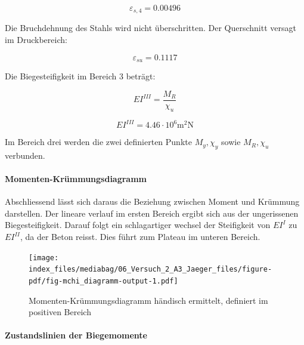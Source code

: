 \documentclass[
  12pt,
  letterpaper,
  egregdoesnotlikesansseriftitles]{scrreprt}
\let\oldparagraph\paragraph
\renewcommand{\paragraph}[1]{\oldparagraph{#1}\mbox{}}
\begin{document}
\begin{equation}\varepsilon_{s,4} = 0.00496\end{equation}

Die Bruchdehnung des Stahls wird nicht überschritten. Der Querschnitt
versagt im Druckbereich:

\begin{equation}\varepsilon_{su} = 0.1117\end{equation}

Die Biegesteifigkeit im Bereich 3 beträgt:

\begin{equation}EI^{III} = \frac{M_{R}}{\chi_{u}}\end{equation}

\begin{equation}EI^{III} = 4.46 \cdot 10^{6} \text{m}^{2} \text{N}\end{equation}

Im Bereich drei werden die zwei definierten Punkte \(M_y, \chi_y\) sowie
\(M_R, \chi_u\) verbunden.

\hypertarget{momenten-kruxfcmmungsdiagramm-1}{%
\paragraph{Momenten-Krümmungsdiagramm}\label{momenten-kruxfcmmungsdiagramm-1}}

Abschliessend lässt sich daraus die Beziehung zwischen Moment und
Krümmung darstellen. Der lineare verlauf im ersten Bereich ergibt sich
aus der ungerissenen Biegesteifigkeit. Darauf folgt ein schlagartiger
wechsel der Steifigkeit von \(EI^I\) zu \(EI^{II}\), da der Beton
reisst. Dies führt zum Plateau im unteren Bereich.

\begin{figure}[H]

{\centering \texttt{[image: index\_files/mediabag/06\_Versuch\_2\_A3\_Jaeger\_files/figure-pdf/fig-mchi\_diagramm-output-1.pdf]}

}

\caption{\label{fig-mchi_diagramm}Momenten-Krümmungsdiagramm händisch
ermittelt, definiert im positiven Bereich}

\end{figure}

\hypertarget{zustandslinien-der-biegemomente}{%
\paragraph{Zustandslinien der
Biegemomente}\label{zustandslinien-der-biegemomente}}
\end{document}
